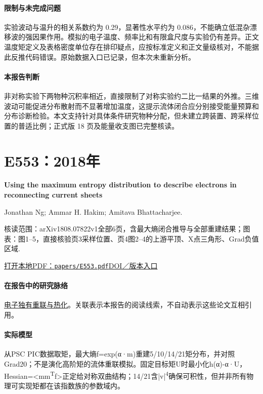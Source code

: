 \paragraph{限制与未完成问题}实验波动与温升的相关系数约为 0.29，显著性水平约为 0.086，不能确立低混杂漂移波的强因果作用。模拟的电子温度、频率比和有限盒尺度与实验仍有差异。正文温度矩定义及表格密度单位存在排印疑点，应按标准定义和正文量级核对，不能据此反推代码错误。原始数据入口已记录，但本次未重新分析。

\paragraph{本报告判断}非对称实验下两物种沉积率相近，直接限制了对称实验约二比一结果的外推。三维波动可能促进分布散射而不显著增加温度，这提示流体闭合应分别接受能量预算和分布诊断检验。本文支持针对具体条件研究物种分配，但未建立跨装置、跨采样位置的普适比例；正式版 18 页及能量收支图已完整核读。

\section{E553：2018年}\label{paper:E553}

\textbf{Using the maximum entropy distribution to describe electrons in reconnecting current sheets}\citep{E553}\

Jonathan Ng;  Ammar H. Hakim;  Amitava Bhattacharjee.

\textsf{核读范围：}arXiv1808.07822v1全部6页，含最大熵闭合推导与全部重建结果；\textsf{图表：}图1–5，直接核验页3采样位置、页4图2–4的上游平顶、X点三角形、Grad负值区域.

\href{run:papers/E553.pdf}{打开本地PDF：\texttt{papers/E553.pdf}}\quad\href{https://doi.org/10.1063/1.5041758}{DOI／版本入口}

\paragraph{在报告中的研究脉络}\hyperref[story:energy]{电子独有重联与热化}。关联表示本报告的阅读线索，不自动表示这些论文互相引用。

\paragraph{实际模型}从PSC PIC数据取矩，最大熵f=exp(α·m)重建5/10/14/21矩分布，并对照Grad20；不是演化高阶矩的流体重联模拟。固定目标矩U时最小化h(α)-α·U，Hessian=<mm\textsuperscript{T}f>正定给对称双曲结构；14/21含|v|\textsuperscript{4}确保可积性，但并非所有物理可实现矩都在该指数族的参数域内。

